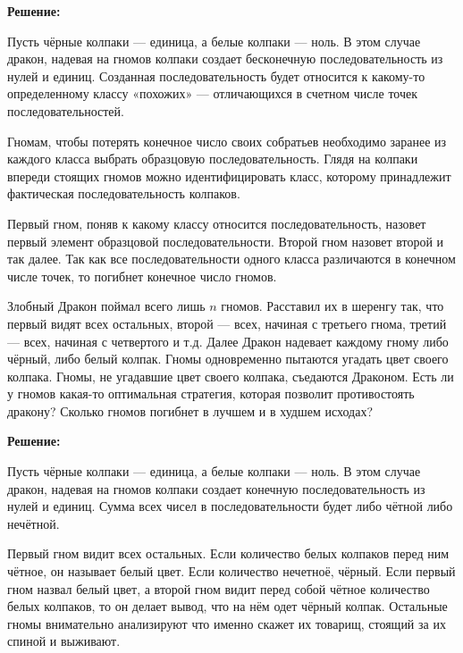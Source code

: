 \documentclass[12pt, a4paper, oneside]{article}
\begin{document}
\textbf{Решение:}

Пусть чёрные колпаки --- единица, а белые колпаки --- ноль. В этом случае дракон, надевая на гномов колпаки создает бесконечную последовательность из нулей и единиц. Созданная последовательность будет относится к какому-то определенному классу «похожих» --- отличающихся в счетном числе точек последовательностей.

Гномам, чтобы потерять конечное число своих собратьев необходимо заранее из каждого класса выбрать образцовую последовательность. Глядя на колпаки впереди стоящих гномов можно идентифицировать класс, которому принадлежит фактическая последовательность колпаков.

Первый гном, поняв к какому классу относится последовательность, назовет первый элемент образцовой последовательности. Второй гном назовет второй и так далее. Так как все последовательности одного класса различаются в конечном числе точек, то погибнет конечное число гномов.

\newpage

\begin{problem}{}
Злобный Дракон поймал всего лишь $n$ гномов. Расставил их в шеренгу так, что первый видят всех остальных, второй --- всех, начиная с третьего гнома, третий --- всех, начиная с четвертого и т.д. Далее Дракон надевает каждому гному либо чёрный, либо белый колпак. Гномы одновременно пытаются угадать цвет своего колпака. Гномы, не угадавшие цвет своего колпака, съедаются Драконом. Есть ли у гномов какая-то оптимальная стратегия, которая позволит противостоять дракону? Сколько гномов погибнет в лучшем и в худшем исходах?
\end{problem}

\textbf{Решение:}

Пусть чёрные колпаки --- единица, а белые колпаки --- ноль. В этом случае дракон, надевая на гномов колпаки создает конечную последовательность из нулей и единиц. Сумма всех чисел в последовательности будет либо чётной либо нечётной.

Первый гном видит всех остальных. Если количество белых колпаков перед ним чётное, он называет белый цвет. Если количество нечетноё, чёрный. Если первый гном назвал белый цвет, а второй гном видит перед собой чётное количество белых колпаков, то он делает вывод, что на нём одет чёрный колпак. Остальные гномы внимательно анализируют что именно скажет их товарищ, стоящий за их спиной и выживают.
\end{document}
